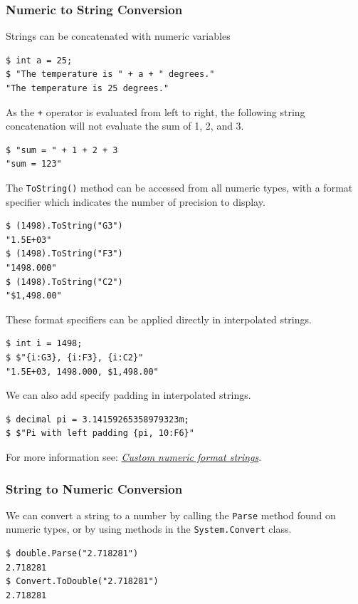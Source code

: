 \documentclass{article}
\begin{document}
\subsubsection{Numeric to String Conversion}
Strings can be concatenated with numeric variables
\begin{lstlisting}
$ int a = 25;
$ "The temperature is " + a + " degrees."
"The temperature is 25 degrees."
\end{lstlisting}
As the \lstinline!+! operator is evaluated from left to right, the following string concatenation
will not evaluate the sum of 1, 2, and 3.
\begin{lstlisting}
$ "sum = " + 1 + 2 + 3
"sum = 123"
\end{lstlisting}
The \lstinline!ToString()! method can be accessed from all numeric types, with a
format specifier which indicates the number of precision to display.
\begin{lstlisting}
$ (1498).ToString("G3")
"1.5E+03"
$ (1498).ToString("F3")
"1498.000"
$ (1498).ToString("C2")
"$1,498.00"
\end{lstlisting}
These format specifiers can be applied directly in interpolated strings.
\begin{lstlisting}
$ int i = 1498;
$ $"{i:G3}, {i:F3}, {i:C2}"
"1.5E+03, 1498.000, $1,498.00"
\end{lstlisting}
We can also add specify padding in interpolated strings.
\begin{lstlisting}
$ decimal pi = 3.14159265358979323m;
$ $"Pi with left padding {pi, 10:F6}"
\end{lstlisting}
For more information see: \href{https://docs.microsoft.com/en-us/dotnet/standard/base-types/custom-numeric-format-strings}{\textit{Custom numeric format strings}}.
\subsubsection{String to Numeric Conversion}
We can convert a string to a number by calling the \lstinline!Parse! method found on numeric types,
or by using methods in the \lstinline!System.Convert! class.
\begin{lstlisting}
$ double.Parse("2.718281")
2.718281
$ Convert.ToDouble("2.718281")
2.718281
\end{lstlisting}
\end{document}
